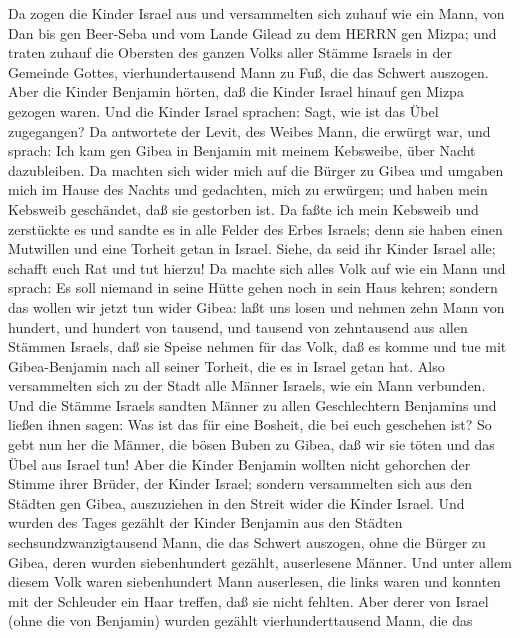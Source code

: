  Da zogen die Kinder Israel aus und versammelten sich zuhauf
wie ein Mann, von Dan bis gen Beer-Seba und vom Lande Gilead zu dem
HERRN gen Mizpa;  und traten zuhauf die Obersten des ganzen
Volks aller Stämme Israels in der Gemeinde Gottes, vierhundertausend
Mann zu Fuß, die das Schwert auszogen.  Aber die Kinder
Benjamin hörten, daß die Kinder Israel hinauf gen Mizpa gezogen waren.
Und die Kinder Israel sprachen: Sagt, wie ist das Übel zugegangen?
 Da antwortete der Levit, des Weibes Mann, die erwürgt war,
und sprach: Ich kam gen Gibea in Benjamin mit meinem Kebsweibe, über
Nacht dazubleiben.  Da machten sich wider mich auf die
Bürger zu Gibea und umgaben mich im Hause des Nachts und gedachten, mich
zu erwürgen; und haben mein Kebsweib geschändet, daß sie gestorben ist.
 Da faßte ich mein Kebsweib und zerstückte es und sandte es
in alle Felder des Erbes Israels; denn sie haben einen Mutwillen und
eine Torheit getan in Israel.  Siehe, da seid ihr Kinder
Israel alle; schafft euch Rat und tut hierzu!  Da machte
sich alles Volk auf wie ein Mann und sprach: Es soll niemand in seine
Hütte gehen noch in sein Haus kehren;  sondern das wollen
wir jetzt tun wider Gibea:  laßt uns losen und nehmen zehn
Mann von hundert, und hundert von tausend, und tausend von zehntausend
aus allen Stämmen Israels, daß sie Speise nehmen für das Volk, daß es
komme und tue mit Gibea-Benjamin nach all seiner Torheit, die es in
Israel getan hat.  Also versammelten sich zu der Stadt alle
Männer Israels, wie ein Mann verbunden.  Und die Stämme
Israels sandten Männer zu allen Geschlechtern Benjamins und ließen ihnen
sagen: Was ist das für eine Bosheit, die bei euch geschehen ist?
 So gebt nun her die Männer, die bösen Buben zu Gibea, daß
wir sie töten und das Übel aus Israel tun! Aber die Kinder Benjamin
wollten nicht gehorchen der Stimme ihrer Brüder, der Kinder Israel;
 sondern versammelten sich aus den Städten gen Gibea,
auszuziehen in den Streit wider die Kinder Israel.  Und
wurden des Tages gezählt der Kinder Benjamin aus den Städten
sechsundzwanzigtausend Mann, die das Schwert auszogen, ohne die Bürger
zu Gibea, deren wurden siebenhundert gezählt, auserlesene Männer.
 Und unter allem diesem Volk waren siebenhundert Mann
auserlesen, die links waren und konnten mit der Schleuder ein Haar
treffen, daß sie nicht fehlten.  Aber derer von Israel
(ohne die von Benjamin) wurden gezählt vierhunderttausend Mann, die das

